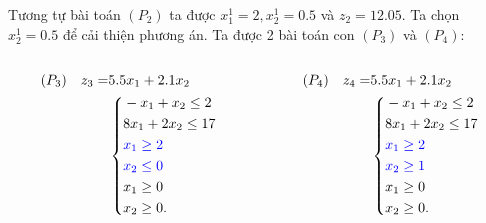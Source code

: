 \documentclass{beamer}
\begin{document}
\begin{frame}
    Tương tự bài toán $(P_2)$ ta được $x^1_1 = 2, x^1_2 = 0.5$ và $z_2=12.05$. Ta chọn $x^1_2 = 0.5$ để cải thiện phương án. Ta được 2 bài toán con $(P_3)$ và $(P_4)$:
    \begin{columns}
\begin{column}{0.5\textwidth}
    \begin{equation*}
        \begin{split}
            (P_3) \quad z_3= & 5.5x_1 + 2.1x_2 \\
            & \left\{\begin{split}
            & -x_1 + x_2 \leq 2 \\
            & 8x_1 + 2x_2 \leq 17 \\
            & \color{blue} x_1 \geq 2 \\
            & \color{blue} x_2 \leq 0 \\
            &x_1 \geq 0 \\
            &x_2 \geq 0. \\
            \end{split}\right. \\
        \end{split}
    \end{equation*}
\end{column}
\begin{column}{0.5\textwidth}
   \begin{equation*}
        \begin{split}
            (P_4) \quad z_4= & 5.5x_1 + 2.1x_2  \\
            & \left\{\begin{split}
            & -x_1 + x_2 \leq 2 \\
            & 8x_1 + 2x_2 \leq 17 \\
            & \color{blue} x_1 \geq 2 \\
            & \color{blue} x_2 \geq 1 \\
            &x_1 \geq 0 \\
            &x_2 \geq 0. \\
            \end{split}\right. \\
        \end{split}
    \end{equation*}
\end{column}
\end{columns}
\end{frame}
\end{document}

